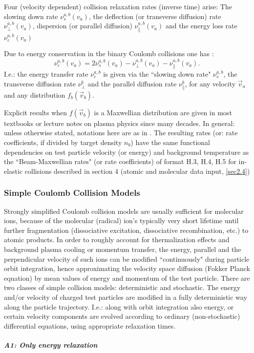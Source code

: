 Four (velocity dependent) collision relaxation rates (inverse time) arise: The
slowing down rate $\nu_s^{a,b}(v_a)$, the deflection (or transverse diffusion)
rate $\nu_\perp^{a,b}(v_a)$, dispersion (or parallel diffusion)
$\nu_\parallel^{a,b}(v_a)$ and the energy loss rate
$\nu_\varepsilon^{a,b}(v_a)$ 

Due to energy conservation in the binary Coulomb collisions one has
\cite{kn:NRL}:
\begin{equation}
  \label{eps1}
  \nu_\varepsilon^{a,b}
  (v_a) = 2 \nu_s^{a,b}(v_a) - \nu_\perp^{a,b}(v_a) - \nu_\parallel^{a,b}(v_a).
\end{equation}
I.e.: the energy transfer rate $\nu_\varepsilon^{a,b}$ is given via the
``slowing down rate" $\nu_s^{a,b}$, the transverse diffusion rate $\nu_\perp^b$
and the parallel diffusion rate $\nu_\parallel^b$, for any velocity $\vec v_a$
and any distribution $f_b(\vec v_b)$.

Explicit results when $f(\vec v_b)$ is a Maxwellian distribution are given in
most textbooks or lecture notes on plasma physics since many decades.
In general: unless otherwise stated, notations here are as in \cite{kn:NRL}.
The resulting rates (or: rate coefficients, if divided by target density $n_b$)
have the same functional dependencies on test particle velocity (or energy) and
background temperature as the ``Beam-Maxwellian rates" (or rate coefficients)
of format H.3, H.4, H.5 for in-elastic collisions described in section 4
(atomic and molecular data input, \cref{sec2.4}) 

\subsubsection{Simple Coulomb Collision Models} 

Strongly simplified Coulomb collision models are usually sufficient for
molecular ions, because of the molecular (radical) ion's typically very short
lifetime until further fragmentation (dissociative excitation, dissociative
recombination, etc.) to atomic products.
In order to roughly account for thermalization effects and background plasma
cooling or momentum transfer,  the energy, parallel and the perpendicular
velocity of such ions can be modified ``continuously" during particle orbit
integration, hence approximating the velocity space diffusion (Fokker Planck
equation) by mean values of energy and momentum of the test particle.
There are two classes of simple collision models: deterministic and stochastic.
The energy and/or velocity of charged test particles are modified in a fully
deterministic way along the particle trajectory.
I.e.: along with orbit integration also energy, or certain velocity components
are evolved according to ordinary (non-stochastic) differential equations,
using appropriate relaxation times.
\subparagraph{A1: Only energy relaxation}\hfill

